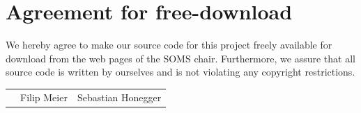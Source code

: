 \documentclass[11pt]{article}
\begin{document}

\newpage


\newpage
\section*{Agreement for free-download}
\bigskip


\bigskip


\large We hereby agree to make our source code for this project freely available for download from the web pages of the SOMS chair. Furthermore, we assure that all source code is written by ourselves and is not violating any copyright restrictions.

\begin{center}

\bigskip


\bigskip


\begin{tabular}{@{}p{3.3cm}@{}p{6cm}@{}@{}p{6cm}@{}}
\begin{minipage}{3cm}

\end{minipage}
&
\begin{minipage}{6cm}
\vspace{2mm} \large Filip Meier

 \vspace{\baselineskip}

\end{minipage}
&
\begin{minipage}{6cm}

\large Sebastian Honegger

\end{minipage}
\end{tabular}


\end{center}
\newpage







\tableofcontents

\newpage

\end{document}
